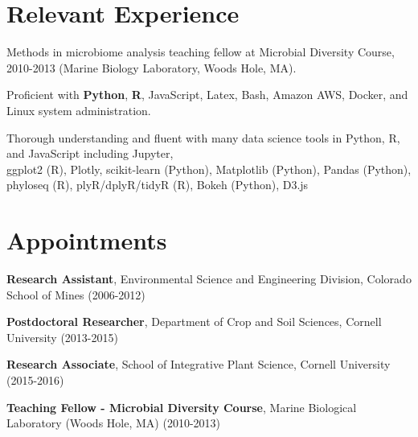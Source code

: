 \documentclass[letterpaper]{article}
\renewenvironment{itemize}{
  \begin{list}{}{
    \setlength{\leftmargin}{1.5em}
  }
}{
  \end{list}
}
\begin{document}
\section*{Relevant Experience}
\begin{itemize}
{\small
    \item Methods in microbiome analysis teaching fellow at
        Microbial Diversity Course, 2010-2013 (Marine Biology Laboratory,
        Woods Hole, MA).
    \item Proficient with \textbf{Python}, \textbf{R}, JavaScript,
        Latex, Bash, Amazon AWS, Docker, and Linux system
        administration.
    \item Thorough understanding and fluent with many data
        science tools in Python, R, and JavaScript including Jupyter,
        \\ ggplot2 (R), Plotly, scikit-learn (Python), Matplotlib (Python), Pandas (Python), phyloseq (R), plyR/dplyR/tidyR (R), Bokeh
        (Python), D3.js
}
\end{itemize}

\section*{Appointments}
\begin{itemize}
    \item \textbf{Research Assistant}, Environmental Science and Engineering
        Division, Colorado School of Mines (2006-2012)
    \item \textbf{Postdoctoral Researcher}, Department of Crop and Soil
        Sciences, Cornell University (2013-2015)
    \item \textbf{Research Associate}, School of Integrative Plant Science,
         Cornell University (2015-2016)
    \item \textbf{Teaching Fellow - Microbial
        Diversity Course}, Marine Biological Laboratory (Woods Hole, MA) (2010-2013)
\end{itemize}
\end{document}
